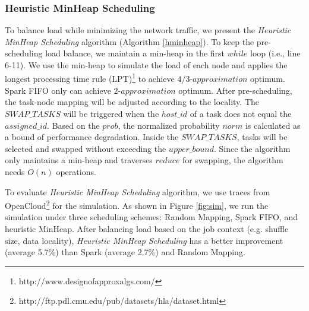 \subsubsection{Heuristic MinHeap Scheduling}\label{h-minheap}
To balance load while minimizing the network traffic, we present the \textit{Heuristic MinHeap Scheduling} algorithm (Algorithm \ref{hminheap}).
{\color{blue}
To keep the pre-scheduling load balance, we maintain a min-heap in the first $while$ loop (i.e., line 6-11).
We use the min-heap to simulate the load of each node and applies the longest processing time rule (LPT)\footnote{http://www.designofapproxalgs.com/} to achieve $4/3\text{-}approximation$ optimum.
Spark FIFO only can achieve $2\text{-}approximation$ optimum.
}
After pre-scheduling, the task-node mapping will be adjusted according to the locality. 
The $SWAP\_TASKS$ will be triggered when the $host\_id$ of a task does not equal the $assigned\_id$.
Based on the $prob$, the normalized probability $norm$ is calculated as a bound of performance degradation. 
Inside the $SWAP\_TASKS$, tasks will be selected and swapped without exceeding the $upper\_bound$.
Since the algorithm only maintains a min-heap and traverses $reduce$ for swapping, the algorithm needs $O(n)$ operations. 

{\color{blue}
To evaluate \textit{Heuristic MinHeap Scheduling} algorithm, we use traces from OpenCloud\footnote{\label{fn:trace}http://ftp.pdl.cmu.edu/pub/datasets/hla/dataset.html} for the simulation.
As shown in Figure \ref{fig:sim}, we run the simulation under three scheduling schemes: Random Mapping, Spark FIFO, and heuristic MinHeap.
After balancing load based on the job context (e.g. shuffle size, data locality), \textit{Heuristic MinHeap Scheduling} has a better improvement (average 5.7\%) than Spark (average 2.7\%) and Random Mapping.
}


